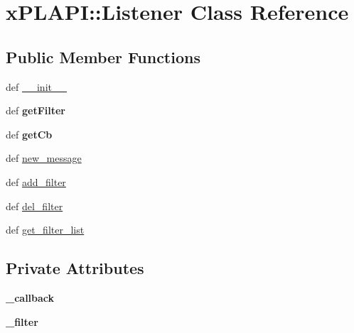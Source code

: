 \hypertarget{classxPLAPI_1_1Listener}{
\section{xPLAPI::Listener Class Reference}
\label{classxPLAPI_1_1Listener}
}
\subsection*{Public Member Functions}
\begin{CompactItemize}
\item 
def \hyperlink{classxPLAPI_1_1Listener_31c68a5ad76d56eff1b78dd646a18e58}{\_\-\_\-init\_\-\_\-}
\item 
\hypertarget{classxPLAPI_1_1Listener_f61ad8e3de5cfd5c8d69aee1cbddaedd}{
def \textbf{getFilter}}
\label{classxPLAPI_1_1Listener_f61ad8e3de5cfd5c8d69aee1cbddaedd}

\item 
\hypertarget{classxPLAPI_1_1Listener_0b3088bf2df0f408d0f2c15989386cca}{
def \textbf{getCb}}
\label{classxPLAPI_1_1Listener_0b3088bf2df0f408d0f2c15989386cca}

\item 
def \hyperlink{classxPLAPI_1_1Listener_a6e3c6a481054d9ff921507b784b0f12}{new\_\-message}
\item 
def \hyperlink{classxPLAPI_1_1Listener_ff3b74767e27828d084af4d34e3fd20e}{add\_\-filter}
\item 
def \hyperlink{classxPLAPI_1_1Listener_babc7a4d6a30876fda2fc593942069b0}{del\_\-filter}
\item 
def \hyperlink{classxPLAPI_1_1Listener_e719472458dd324763b91364a3991df1}{get\_\-filter\_\-list}
\end{CompactItemize}
\subsection*{Private Attributes}
\begin{CompactItemize}
\item 
\hypertarget{classxPLAPI_1_1Listener_64bd36ca836cbd2d56417dc17b83f8cf}{
\textbf{\_\-callback}}
\label{classxPLAPI_1_1Listener_64bd36ca836cbd2d56417dc17b83f8cf}

\item 
\hypertarget{classxPLAPI_1_1Listener_daa53232362ca9b704223184d9ef612f}{
\textbf{\_\-filter}}
\label{classxPLAPI_1_1Listener_daa53232362ca9b704223184d9ef612f}

\end{CompactItemize}


